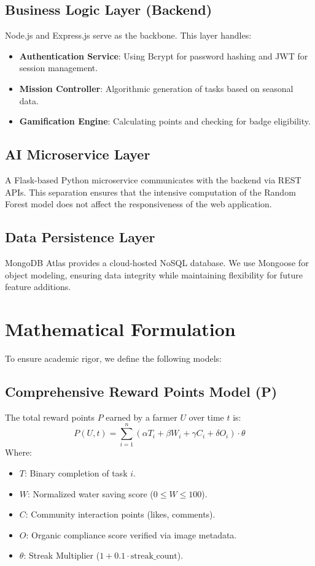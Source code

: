 \documentclass[journal]{IEEEtran}
\begin{document}
\subsection{Business Logic Layer (Backend)}
Node.js and Express.js serve as the backbone. This layer handles:
\begin{itemize}
    \item \textbf{Authentication Service}: Using Bcrypt for password hashing and JWT for session management.
    \item \textbf{Mission Controller}: Algorithmic generation of tasks based on seasonal data.
    \item \textbf{Gamification Engine}: Calculating points and checking for badge eligibility.
\end{itemize}

\subsection{AI Microservice Layer}
A Flask-based Python microservice communicates with the backend via REST APIs. This separation ensures that the intensive computation of the Random Forest model does not affect the responsiveness of the web application.

\subsection{Data Persistence Layer}
MongoDB Atlas provides a cloud-hosted NoSQL database. We use Mongoose for object modeling, ensuring data integrity while maintaining flexibility for future feature additions.

\section{Mathematical Formulation}
To ensure academic rigor, we define the following models:

\subsection{Comprehensive Reward Points Model (P)}
The total reward points $P$ earned by a farmer $U$ over time $t$ is:
\begin{equation}
P(U,t) = \sum_{i=1}^{n} (\alpha T_i + \beta W_i + \gamma C_i + \delta O_i) \cdot \theta
\end{equation}
Where:
\begin{itemize}
    \item $T$: Binary completion of task $i$.
    \item $W$: Normalized water saving score ($0 \leq W \leq 100$).
    \item $C$: Community interaction points (likes, comments).
    \item $O$: Organic compliance score verified via image metadata.
    \item $\theta$: Streak Multiplier ($1 + 0.1 \cdot \text{streak\_count}$).
\end{itemize}
\end{document}
